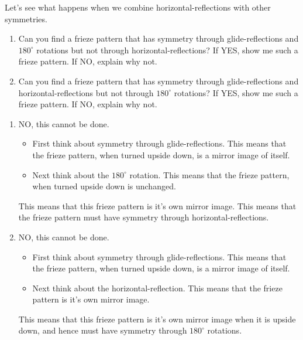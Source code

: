 \documentclass[noauthor,nooutcomes,12pt,hints,handout]{ximera}
\begin{document}
\begin{question}
  Let's see what happens when we combine horizontal-reflections with
  other symmetries.
  \begin{enumerate}
  \item Can you find a frieze pattern that has symmetry through
    glide-reflections and $180^\circ$ rotations but not through
    horizontal-reflections? If YES, show me such a frieze pattern. If
    NO, explain why not.
  \item Can you find a frieze pattern that has symmetry through
    glide-reflections and horizontal-reflections but not through
    $180^\circ$ rotations? If YES, show me such a frieze pattern. If
    NO, explain why not.
  \end{enumerate}
    
  \begin{freeResponse}
    \begin{enumerate}
    \item NO, this cannot be done.
      \begin{itemize}
      \item First think about symmetry through glide-reflections. This
        means that the frieze pattern, when turned upside down, is a
        mirror image of itself.
      \item Next think about the $180^\circ$ rotation. This means that
        the frieze pattern, when turned upside down is unchanged.
      \end{itemize}
      This means that this frieze pattern is it's own mirror image. This
      means that the frieze pattern must have symmetry through
      horizontal-reflections.
    \item NO, this cannot be done.
      \begin{itemize}
      \item First think about symmetry through glide-reflections. This
        means that the frieze pattern, when turned upside down, is a
        mirror image of itself.
      \item Next think about the horizontal-reflection. This means
        that the frieze pattern is it's own mirror image.
      \end{itemize}
      This means that this frieze pattern is it's own mirror image
      when it is upside down, and hence must have symmetry through
      $180^\circ$ rotations.
    \end{enumerate}
  \end{freeResponse}
\end{question}
\mynewpage
\end{document}
